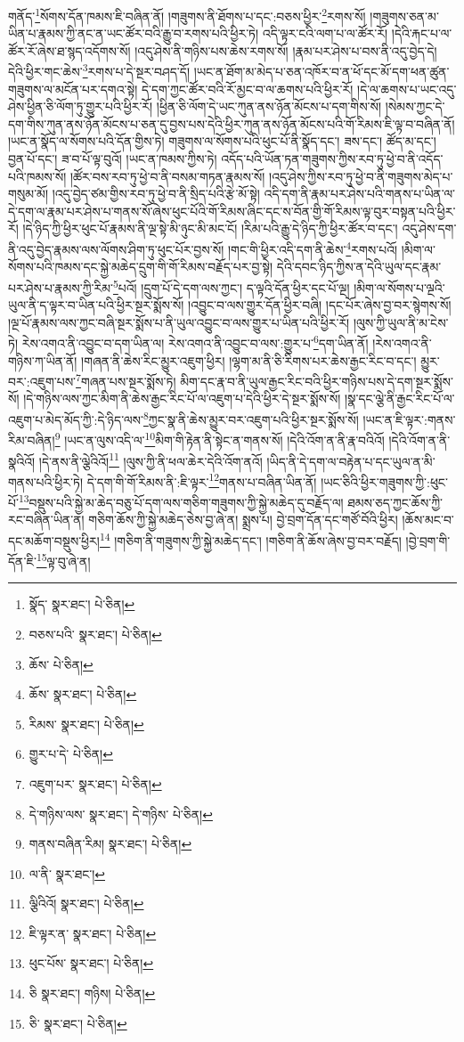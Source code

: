གནོད་\footnote{སྣོད་  སྣར་ཐང་།  པེ་ཅིན། }སོགས་དོན་ཁམས་ཇི་བཞིན་ནོ། །གཟུགས་ནི་ཐོགས་པ་དང་:བཅས་ཕྱིར་\footnote{བཅས་པའི་  སྣར་ཐང་།  པེ་ཅིན། }རགས་སོ། །གཟུགས་ཅན་མ་ཡིན་པ་རྣམས་ཀྱི་ནང་ན་ཡང་ཚོར་བའི་རྒྱུ་བ་རགས་པའི་ཕྱིར་ཏེ། འདི་ལྟར་ངའི་ལག་པ་ལ་ཚོར་རོ། །དེའི་རྐང་པ་ལ་ཚོར་རོ་ཞེས་ཐ་སྙད་འདོགས་སོ། །འདུ་ཤེས་ནི་གཉིས་པས་ཆེས་རགས་སོ། །རྣམ་པར་ཤེས་པ་བས་ནི་འདུ་བྱེད་དེ། དེའི་ཕྱིར་གང་ཆེས་\footnote{ཆོས་  པེ་ཅིན། }རགས་པ་དེ་སྔར་བཤད་དོ། །ཡང་ན་ཐོག་མ་མེད་པ་ཅན་འཁོར་བ་ན་ཕོ་དང་མོ་དག་ཕན་ཚུན་གཟུགས་ལ་མངོན་པར་དགའ་སྟེ། དེ་དག་ཀྱང་ཚོར་བའི་རོ་མྱང་བ་ལ་ཆགས་པའི་ཕྱིར་རོ། །དེ་ལ་ཆགས་པ་ཡང་འདུ་ཤེས་ཕྱིན་ཅི་ལོག་ཏུ་གྱུར་པའི་ཕྱིར་རོ། །ཕྱིན་ཅི་ལོག་དེ་ཡང་ཀུན་ནས་ཉོན་མོངས་པ་དག་གིས་སོ། །སེམས་ཀྱང་དེ་དག་གིས་ཀུན་ནས་ཉོན་མོངས་པ་ཅན་དུ་བྱས་པས་དེའི་ཕྱིར་ཀུན་ནས་ཉོན་མོངས་པའི་གོ་རིམས་ཇི་ལྟ་བ་བཞིན་ནོ། །ཡང་ན་སྣོད་ལ་སོགས་པའི་དོན་གྱིས་ཏེ། གཟུགས་ལ་སོགས་པའི་ཕུང་པོ་ནི་སྣོད་དང་། ཟས་དང་། ཚོད་མ་དང་། བྱན་པོ་དང་། ཟ་བ་པོ་ལྟ་བུའོ། །ཡང་ན་ཁམས་ཀྱིས་ཏེ། འདོད་པའི་ཡོན་ཏན་གཟུགས་ཀྱིས་རབ་ཏུ་ཕྱེ་བ་ནི་འདོད་པའི་ཁམས་སོ། །ཚོར་བས་རབ་ཏུ་ཕྱེ་བ་ནི་བསམ་གཏན་རྣམས་སོ། །འདུ་ཤེས་ཀྱིས་རབ་ཏུ་ཕྱེ་བ་ནི་གཟུགས་མེད་པ་གསུམ་མོ། །འདུ་བྱེད་ཙམ་གྱིས་རབ་ཏུ་ཕྱེ་བ་ནི་སྲིད་པའི་རྩེ་མོ་སྟེ། འདི་དག་ནི་རྣམ་པར་ཤེས་པའི་གནས་པ་ཡིན་ལ་དེ་དག་ལ་རྣམ་པར་ཤེས་པ་གནས་སོ་ཞེས་ཕུང་པོའི་གོ་རིམས་ཞིང་དང་ས་བོན་གྱི་གོ་རིམས་ལྟ་བུར་བསྟན་པའི་ཕྱིར་རོ། །དེ་ཉིད་ཀྱི་ཕྱིར་ཕུང་པོ་རྣམས་ནི་ལྔ་སྟེ་མི་ཉུང་མི་མང་ངོ། །རིམ་པའི་རྒྱུ་དེ་ཉིད་ཀྱི་ཕྱིར་ཚོར་བ་དང་། འདུ་ཤེས་དག་ནི་འདུ་བྱེད་རྣམས་ལས་ལོགས་ཤིག་ཏུ་ཕུང་པོར་བྱས་སོ། །གང་གི་ཕྱིར་འདི་དག་ནི་ཆེས་\footnote{ཆོས་  སྣར་ཐང་།  པེ་ཅིན། }རགས་པའོ། །མིག་ལ་སོགས་པའི་ཁམས་དང་སྐྱེ་མཆེད་དྲུག་གི་གོ་རིམས་བརྗོད་པར་བྱ་སྟེ། དེའི་དབང་ཉིད་ཀྱིས་ན་དེའི་ཡུལ་དང་རྣམ་པར་ཤེས་པ་རྣམས་ཀྱི་རིམ་\footnote{རིམས་  སྣར་ཐང་།  པེ་ཅིན། }པའོ། །དྲུག་པོ་དེ་དག་ལས་ཀྱང་། ད་ལྟའི་དོན་ཕྱིར་དང་པོ་ལྔ། །མིག་ལ་སོགས་པ་ལྔའི་ཡུལ་ནི་ད་ལྟར་བ་ཡིན་པའི་ཕྱིར་སྔར་སྨོས་སོ། །འབྱུང་བ་ལས་གྱུར་དོན་ཕྱིར་བཞི། །དང་པོར་ཞེས་བྱ་བར་སྙེགས་སོ། །ལྔ་པོ་རྣམས་ལས་ཀྱང་བཞི་སྔར་སྨོས་པ་ནི་ཡུལ་འབྱུང་བ་ལས་གྱུར་པ་ཡིན་པའི་ཕྱིར་རོ། །ལུས་ཀྱི་ཡུལ་ནི་མ་ངེས་ཏེ། རེས་འགའ་ནི་འབྱུང་བ་དག་ཡིན་ལ། རེས་འགའ་ནི་འབྱུང་བ་ལས་:གྱུར་པ་\footnote{གྱུར་པ་དེ་  པེ་ཅིན། }དག་ཡིན་ནོ། །རེས་འགའ་ནི་གཉིས་ཀ་ཡིན་ནོ། །གཞན་ནི་ཆེས་རིང་མྱུར་འཇུག་ཕྱིར། །ལྷག་མ་ནི་ཅི་རིགས་པར་ཆེས་རྒྱང་རིང་བ་དང་། མྱུར་བར་:འཇུག་པས་\footnote{འཇུག་པར་  སྣར་ཐང་།  པེ་ཅིན། }གཞན་པས་སྔར་སྨོས་ཏེ། མིག་དང་རྣ་བ་ནི་ཡུལ་རྒྱང་རིང་བའི་ཕྱིར་གཉིས་པས་དེ་དག་སྔར་སྨོས་སོ། །དེ་གཉིས་ལས་ཀྱང་མིག་ནི་ཆེས་རྒྱང་རིང་པོ་ལ་འཇུག་པ་དེའི་ཕྱིར་དེ་སྔར་སྨོས་སོ། །སྣ་དང་ལྕེ་ནི་རྒྱང་རིང་པོ་ལ་འཇུག་པ་མེད་མོད་ཀྱི་:དེ་ཉིད་ལས་\footnote{དེ་གཉིས་ལས་  སྣར་ཐང་། དེ་གཉིས་  པེ་ཅིན། }ཀྱང་སྣ་ནི་ཆེས་མྱུར་བར་འཇུག་པའི་ཕྱིར་སྔར་སྨོས་སོ། །ཡང་ན་ཇི་ལྟར་:གནས་རིམ་བཞིན།\footnote{གནས་བཞིན་རིམ།  སྣར་ཐང་།  པེ་ཅིན། } །ཡང་ན་ལུས་འདི་ལ་\footnote{ལ་ནི་  སྣར་ཐང་། }མིག་གི་རྟེན་ནི་སྟེང་ན་གནས་སོ། །དེའི་འོག་ན་ནི་རྣ་བའིའོ། །དེའི་འོག་ན་ནི་སྣའིའོ། །དེ་ནས་ནི་ལྕེའིའོ།\footnote{ལྕིའིའོ།  སྣར་ཐང་།  པེ་ཅིན། } །ལུས་ཀྱི་ནི་ཕལ་ཆེར་དེའི་འོག་ནའོ། །ཡིད་ནི་དེ་དག་ལ་བརྟེན་པ་དང་ཡུལ་ན་མི་གནས་པའི་ཕྱིར་ཏེ། དེ་དག་གི་གོ་རིམས་ནི་:ཇི་ལྟར་\footnote{ཇི་ལྟར་ན་  སྣར་ཐང་།  པེ་ཅིན། }གནས་པ་བཞིན་ཡིན་ནོ། །ཡང་ཅིའི་ཕྱིར་གཟུགས་ཀྱི་:ཕུང་པོ་\footnote{ཕུང་པོས་  སྣར་ཐང་།  པེ་ཅིན། }བསྡུས་པའི་སྐྱེ་མ་ཆེད་བཅུ་པོ་དག་ལས་གཅིག་གཟུགས་ཀྱི་སྐྱེ་མཆེད་དུ་བརྗོད་ལ། ཐམས་ཅད་ཀྱང་ཆོས་ཀྱི་རང་བཞིན་ཡིན་ན། གཅིག་ཆོས་ཀྱི་སྐྱེ་མཆེད་ཅེས་བྱ་ཞེ་ན། སྨྲས་པ། བྱེ་བྲག་དོན་དང་གཙོ་བོའི་ཕྱིར། །ཆོས་མང་བ་དང་མཆོག་བསྡུས་ཕྱིར།\footnote{ཅི  སྣར་ཐང་། གཉིས།  པེ་ཅིན། } །གཅིག་ནི་གཟུགས་ཀྱི་སྐྱེ་མཆེད་དང་། །གཅིག་ནི་ཆོས་ཞེས་བྱ་བར་བརྗོད། །བྱེ་བྲག་གི་དོན་ཇི་\footnote{ཅི་  སྣར་ཐང་།  པེ་ཅིན། }ལྟ་བུ་ཞེ་ན། 